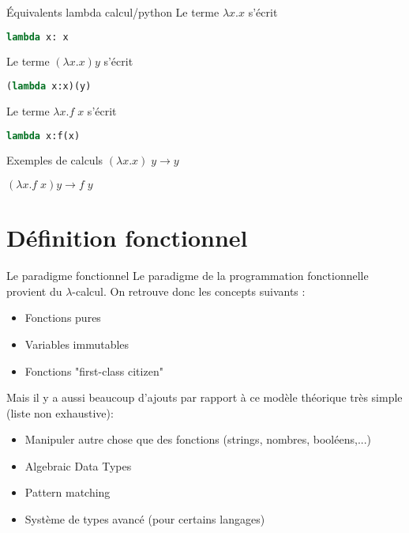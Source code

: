 \documentclass[aspectratio=169]{beamer}
\begin{document}
\begin{frame}[fragile]
    \begin{block}{Équivalents lambda calcul/python}
        Le terme $\lambda x.x$ s'écrit 

        \begin{lstlisting}[language=Python]
lambda x: x          
        \end{lstlisting}
        
        Le terme $(\lambda x.x) y$ s'écrit

        \begin{lstlisting}[language=Python]
(lambda x:x)(y)      
        \end{lstlisting}
    
        Le terme $\lambda x.f\;x$ s'écrit

        \begin{lstlisting}[language=Python]
lambda x:f(x)         
        \end{lstlisting}
    \end{block}

    \begin{block}{Exemples de calculs}
        $(\lambda x.x)\;y \rightarrow y$

        $(\lambda x.f\;x) y \rightarrow f\;y$
    \end{block}

\end{frame}

\section{Définition fonctionnel}

\begin{frame}{Le paradigme fonctionnel}
    Le paradigme de la programmation fonctionnelle provient du $\lambda$-calcul. On retrouve donc les concepts suivants :
    \begin{itemize}
        \item Fonctions pures
        \item Variables immutables
        \item Fonctions "first-class citizen"
    \end{itemize}
    Mais il y a aussi beaucoup d'ajouts par rapport à ce modèle théorique très simple (liste non exhaustive):
    \begin{itemize}
        \item Manipuler autre chose que des fonctions (strings, nombres, booléens,...)
        \item Algebraic Data Types
        \item Pattern matching
        \item Système de types avancé (pour certains langages)
    \end{itemize}
\end{frame}
\end{document}
